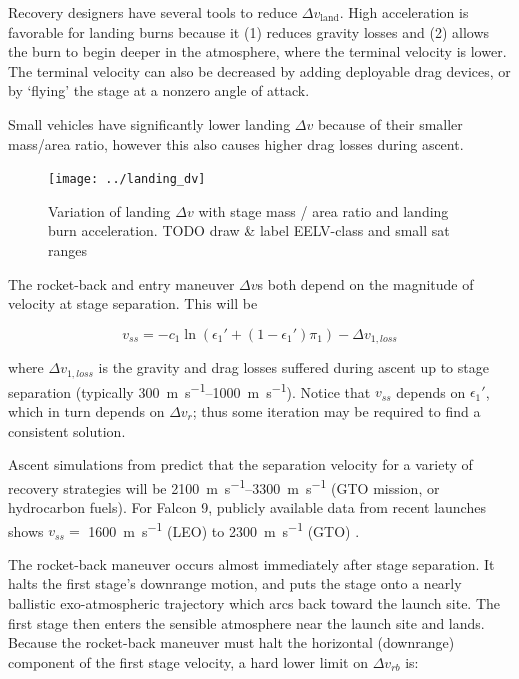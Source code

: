\documentclass[conf]{new-aiaa}
\begin{document}
Recovery designers have several tools to reduce $\Delta v_{\mathrm{land}}$. High acceleration is favorable for landing burns because it (1) reduces gravity losses and (2) allows the burn to begin deeper in the atmosphere, where the terminal velocity is lower. The terminal velocity can also be decreased by adding deployable drag devices, or by `flying' the stage at a nonzero angle of attack.

Small vehicles have significantly lower landing $\Delta v$ because of their smaller mass/area ratio, however this also causes higher drag losses during ascent.

\begin{figure}[hbt!]
	\centering
	\texttt{[image: ../landing\_dv]}
	\label{fig:landing_dv}
	\caption{Variation of landing $\Delta v$ with stage mass / area ratio and landing burn acceleration. TODO draw \& label EELV-class and small sat ranges}
\end{figure}

The rocket-back and entry maneuver $\Delta v$s both depend on the magnitude of velocity at stage separation. This will be

\begin{equation}
v_{ss} = - c_1 \ln\left( \epsilon_1' + (1 - \epsilon_1') \pi_1 \right) - \Delta v_{1,loss}
\end{equation}

where $\Delta v_{1,loss}$ is the gravity and drag losses suffered during ascent up to stage separation (typically \SIrange{300}{1000}{\meter\per\second}). Notice that $v_{ss}$ depends on $\epsilon_1'$, which in turn depends on $\Delta v_r$; thus some iteration may be required to find a consistent solution.

Ascent simulations from \cite{Stappert2017} predict that the separation velocity for a variety of recovery strategies will be \SIrange{2100}{3300}{\meter\per\second} (GTO mission,  or hydrocarbon fuels). For Falcon 9, publicly available data from recent launches shows $v_{ss} =$ \SI{1600}{\meter\per\second} (LEO) to \SI{2300}{\meter\per\second} (GTO) \cite{SpaceXWebcast}.

The rocket-back maneuver occurs almost immediately after stage separation. It halts the first stage's downrange motion, and puts the stage onto a nearly ballistic exo-atmospheric trajectory which arcs back toward the launch site. The first stage then enters the sensible atmosphere near the launch site and lands. Because the rocket-back maneuver must halt the horizontal (downrange) component of the first stage velocity, a hard lower limit on $\Delta v_{rb}$ is:
\end{document}
